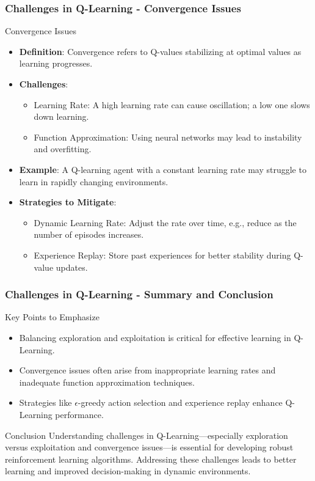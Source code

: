 \documentclass[aspectratio=169]{beamer}
\begin{document}
\begin{frame}[fragile]
    \frametitle{Challenges in Q-Learning - Convergence Issues}
    \begin{block}{Convergence Issues}
        \begin{itemize}
            \item \textbf{Definition}: Convergence refers to Q-values stabilizing at optimal values as learning progresses.
            \item \textbf{Challenges}:
            \begin{itemize}
                \item Learning Rate: A high learning rate can cause oscillation; a low one slows down learning.
                \item Function Approximation: Using neural networks may lead to instability and overfitting.
            \end{itemize}
            \item \textbf{Example}: A Q-learning agent with a constant learning rate may struggle to learn in rapidly changing environments.
            \item \textbf{Strategies to Mitigate}:
            \begin{itemize}
                \item Dynamic Learning Rate: Adjust the rate over time, e.g., reduce as the number of episodes increases.
                \item Experience Replay: Store past experiences for better stability during Q-value updates.
            \end{itemize}
        \end{itemize}
    \end{block}
\end{frame}

\begin{frame}[fragile]
    \frametitle{Challenges in Q-Learning - Summary and Conclusion}
    \begin{block}{Key Points to Emphasize}
        \begin{itemize}
            \item Balancing exploration and exploitation is critical for effective learning in Q-Learning.
            \item Convergence issues often arise from inappropriate learning rates and inadequate function approximation techniques.
            \item Strategies like \(\epsilon\)-greedy action selection and experience replay enhance Q-Learning performance.
        \end{itemize}
    \end{block}
    \begin{block}{Conclusion}
        Understanding challenges in Q-Learning—especially exploration versus exploitation and convergence issues—is essential for developing robust reinforcement learning algorithms. Addressing these challenges leads to better learning and improved decision-making in dynamic environments.
    \end{block}
\end{frame}
\end{document}
